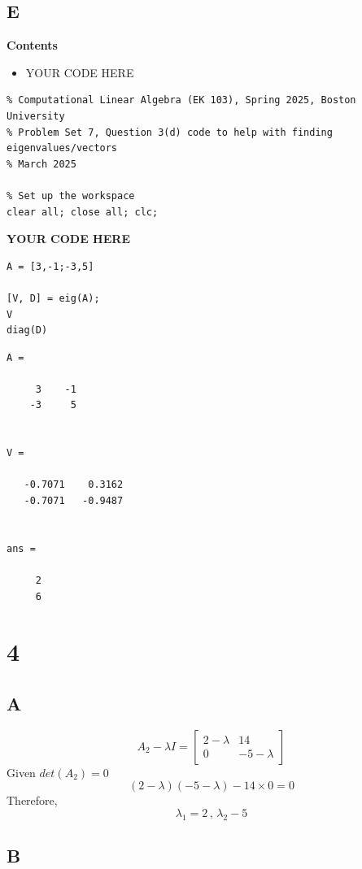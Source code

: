 \documentclass{article}
\begin{document}
\subsection*{E}

\textbf{Contents}

\begin{itemize}
	\setlength{\itemsep}{-1ex}
	\item YOUR CODE HERE
\end{itemize}
\begin{verbatim}
% Computational Linear Algebra (EK 103), Spring 2025, Boston University
% Problem Set 7, Question 3(d) code to help with finding eigenvalues/vectors
% March 2025

% Set up the workspace
clear all; close all; clc;
\end{verbatim}


\textbf{YOUR CODE HERE}

\begin{verbatim}
A = [3,-1;-3,5]

[V, D] = eig(A);
V
diag(D)
\end{verbatim}

\color{lightgray} \begin{verbatim}
A =

     3    -1
    -3     5


V =

   -0.7071    0.3162
   -0.7071   -0.9487


ans =

     2
     6

\end{verbatim} \color{black}

\section*{4}

\subsection*{A}

\[
	A_2 - \lambda I =
	\begin{bmatrix}
		2 - \lambda & 14           \\
		0           & -5 - \lambda
	\end{bmatrix}
\]
Given \(det(A_2) = 0\)
\[
	(2 - \lambda)(-5 - \lambda) - 14 \times 0 = 0
\]
Therefore,
\[
	\lambda_1 = 2 \, , \, \lambda_2 -5
\]

\subsection*{B}
\end{document}
